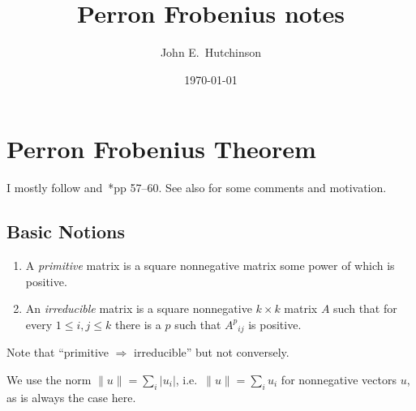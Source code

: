 \documentclass[a4paper]{amsart}
\theoremstyle{plain}
\theoremstyle{definition}
\theoremstyle{remark}
\begin{document}
\title{Perron Frobenius notes}  
\author{John E.\ Hutchinson}
\date{\today}


\maketitle

\tableofcontents




\section{\textbf{Perron Frobenius Theorem}}   I mostly follow \cite{Boy} and~\cite{ Bri}*{pp 57--60}.  See also \cite{Boyd} for some comments and motivation.

\subsection{Basic Notions}

\begin{enumerate}

\item  A \emph{primitive} matrix is a square nonnegative matrix some power of which is positive.

\item An \emph{irreducible} matrix is a square nonnegative $ k\times k $ matrix $ A $ such that for every $1\leq  i,j \leq k $ there is a $ p $ such that $ {A^p}_{ij} $ is positive.
\end{enumerate} 

Note that ``primitive $ \Longrightarrow $ irreducible'' but not conversely.

We use the norm $ \|u\|= \sum_i |u_i| $, i.e.\  $ \|u\|= \sum_i u_i $ for nonnegative vectors $ u $, as is always the case here.

\end{document}
